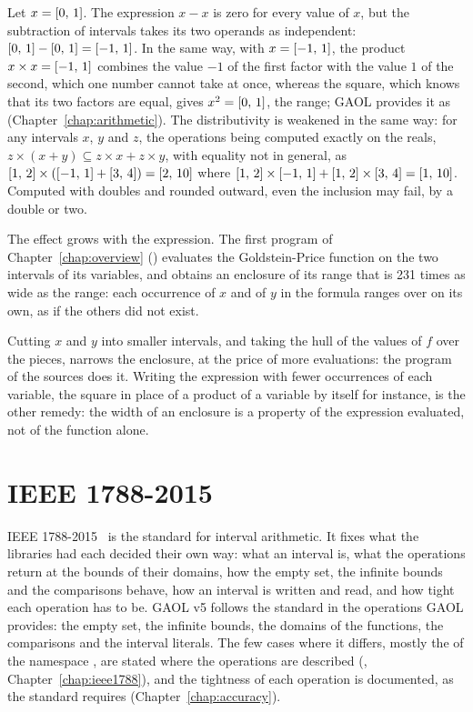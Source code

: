 \begin{Ex}\label{ex:dependency}
Let $x=[0,\,1]$. The expression $x-x$ is zero for every value of $x$,
but the subtraction of intervals takes its two operands as independent:
$[0,\,1]-[0,\,1]=[-1,\,1]$. In the same way, with $x=[-1,\,1]$,
the product $x\times x=[-1,\,1]$ combines the value $-1$ of the first
factor with the value $1$ of the second, which one number cannot take at
once, whereas the square, which knows that its two factors are equal, gives
$x^2=[0,\,1]$, the range; GAOL provides it as 
(Chapter~\ref{chap:arithmetic}). The distributivity is weakened in the same
way: for any intervals $x$, $y$ and $z$, the operations being computed
exactly on the reals,
$z\times(x+y)\subseteq z\times x+z\times y$, with equality not in general,
as $[1,\,2]\times([-1,\,1]+[3,\,4])=[2,\,10]$ where
$[1,\,2]\times[-1,\,1]+[1,\,2]\times[3,\,4]=[1,\,10]$. Computed
with doubles and rounded outward, even the inclusion may fail, by a double or two.
\end{Ex}

The effect grows with the expression. The first program of
Chapter~\ref{chap:overview} () evaluates the
Goldstein-Price function on the two intervals  of its variables,
and obtains an enclosure of its range that is 231 times as wide as the range:
each occurrence of $x$ and of $y$ in the formula ranges over  on
its own, as if the others did not exist.
%

\medskip
Cutting $x$ and $y$ into smaller intervals, and taking the hull of the
values of $f$ over the pieces, narrows the enclosure, at the price of more
evaluations: the program  of the
sources does it. Writing the expression with fewer occurrences of each
variable, the square in place of a product of a variable by itself for
instance, is the other remedy: the width of an enclosure is a property of
the expression evaluated, not of the function alone.

\section{IEEE 1788-2015}\label{sec:ieee1788-overview}
%

IEEE 1788-2015~\cite{IEEE1788:2015} is the standard for interval
arithmetic. It fixes what the libraries had each decided their own way:
what an interval is, what the operations return at the bounds of their
domains, how the empty set, the infinite bounds and the comparisons behave,
how an interval is written and read, and how tight each operation has to
be. GAOL v5 follows the standard in the operations GAOL provides: the empty
set, the infinite bounds, the domains of the functions, the comparisons and
the interval literals. The few cases where it differs, mostly the
 of the namespace , are stated where the operations
are described (, Chapter~\ref{chap:ieee1788}),
and the tightness of each operation is documented, as the standard requires
(Chapter~\ref{chap:accuracy}).

